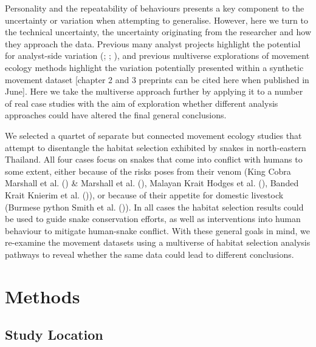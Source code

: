 \documentclass[10pt,a4paper]{article}
\begin{document}
Personality and the repeatability of behaviours presents a key component to the uncertainty or variation when attempting to generalise.
However, here we turn to the technical uncertainty, the uncertainty originating from the researcher and how they approach the data.
Previous many analyst projects highlight the potential for analyst-side variation (; ; ), and previous multiverse explorations of movement ecology methods highlight the variation potentially presented within a synthetic movement dataset {[}chapter 2 and 3 preprints can be cited here when published in June{]}.
Here we take the multiverse approach further by applying it to a number of real case studies with the aim of exploration whether different analysis approaches could have altered the final general conclusions.

We selected a quartet of separate but connected movement ecology studies that attempt to disentangle the habitat selection exhibited by snakes in north-eastern Thailand.
All four cases focus on snakes that come into conflict with humans to some extent, either because of the risks poses from their venom (King Cobra Marshall et al. () \& Marshall et al. (), Malayan Krait Hodges et al. (), Banded Krait Knierim et al. ()), or because of their appetite for domestic livestock (Burmese python Smith et al. ()).
In all cases the habitat selection results could be used to guide snake conservation efforts, as well as interventions into human behaviour to mitigate human-snake conflict.
With these general goals in mind, we re-examine the movement datasets using a multiverse of habitat selection analysis pathways to reveal whether the same data could lead to different conclusions.

\section{Methods}\label{methods}

\subsection{Study Location}\label{study-location}
\end{document}
